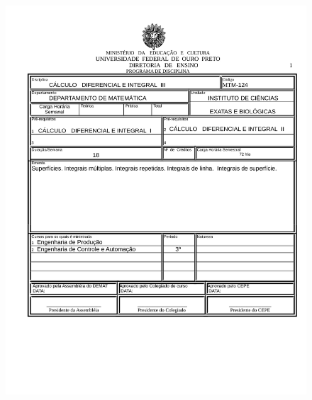 \begin{figure}[p]
	\centering 
	\includegraphics[scale=0.7]{capitulos/anexo1-programas-disciplina/p35.pdf}
\end{figure}

